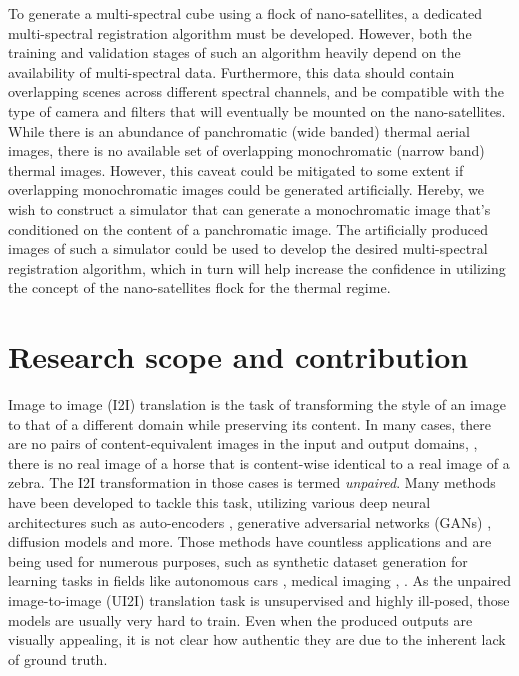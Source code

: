 To generate a multi-spectral cube using a flock of nano-satellites, a dedicated multi-spectral registration algorithm must be developed.
However, both the training and validation stages of such an algorithm heavily depend on the availability of multi-spectral data.
Furthermore, this data should contain overlapping scenes across different spectral channels, and be compatible with the type of camera and filters that will eventually be mounted on the nano-satellites. 
While there is an abundance of panchromatic (wide banded) thermal aerial images, there is no available set of overlapping monochromatic (narrow band) thermal images. 
However, this caveat could be mitigated to some extent if overlapping monochromatic images could be generated artificially.
Hereby, we wish to construct a simulator that can generate a monochromatic image that's conditioned on the content of a panchromatic image. 
The artificially produced images of such a simulator could be used to develop the desired multi-spectral registration algorithm, which in turn will help increase the confidence in utilizing the concept of the nano-satellites flock for the thermal regime.

\section{Research scope and contribution}
Image to image (I2I) translation is the task of transforming the style of an image to that of a different domain while preserving its content. 
In many cases, there are no pairs of content-equivalent images in the input and output domains, \eg, there is no real image of a horse that is content-wise identical to a real image of a zebra. 
The I2I transformation in those cases is termed \emph{unpaired}.
Many methods have been developed to tackle this task, utilizing various deep neural architectures such as auto-encoders \cite{zhao2021unpaired}, generative adversarial networks (GANs) \cite{CycleGAN2017, park2020cut, zhao2020unpaired}, diffusion models \cite{DBLP:journals/corr/abs-2104-05358, saharia2022palette} and more.
Those methods have countless applications and are being used for numerous purposes, such as synthetic dataset generation for learning tasks in fields like autonomous cars \cite{https://doi.org/10.48550/arxiv.1812.01710, Dundar2018DomainSA}, medical imaging \cite{Thambawita_2022, chen2021synthetic}, \etc.
As the unpaired image-to-image (UI2I) translation task is unsupervised and highly ill-posed, those models are usually very hard to train.
Even when the produced outputs are visually appealing, it is not clear how authentic they are due to the inherent lack of ground truth.

